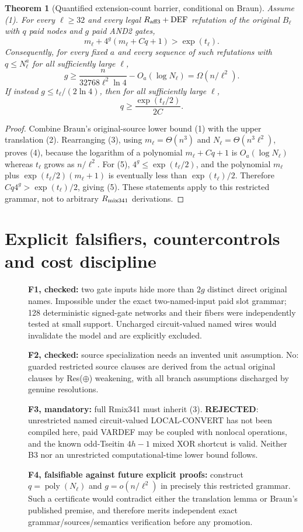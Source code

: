 \documentclass[11pt]{article}
\newtheorem{theorem}{Theorem}
\begin{document}
\begin{theorem}[Quantified extension-count barrier, conditional on Braun]
Assume (1). For every $\ell\ge32$ and every legal $R_{\rm aff3}+\mathrm{DEF}$ refutation of the original $B_\ell$ with $q$ paid nodes and $g$ paid AND2 gates,
\[
 \boxed{m_\ell+4^g(m_\ell+Cq+1)>\exp(t_\ell).}\tag{3}
\]
Consequently, for every fixed $a$ and every sequence of such refutations with $q\le N_\ell^a$ for all sufficiently large $\ell$,
\[
 \boxed{g\ge \frac{n}{32768\ell^2\ln4}-O_a(\log N_\ell)=\Omega(n/\ell^2).}\tag{4}
\]
If instead $g\le t_\ell/(2\ln4)$, then for all sufficiently large $\ell$,
\[
\boxed{q\ge \frac{\exp(t_\ell/2)}{2C}.}\tag{5}
\]
\end{theorem}
\begin{proof}
Combine Braun's original-source lower bound (1) with the upper translation (2). Rearranging (3), using $m_\ell=\Theta(n^3)$ and $N_\ell=\Theta(n^3\ell^2)$, proves (4), because the logarithm of a polynomial $m_\ell+Cq+1$ is $O_a(\log N_\ell)$ whereas $t_\ell$ grows as $n/\ell^2$. For (5), $4^g\le\exp(t_\ell/2)$, and the polynomial $m_\ell$ plus $\exp(t_\ell/2)(m_\ell+1)$ is eventually less than $\exp(t_\ell)/2$. Therefore $Cq4^g>\exp(t_\ell)/2$, giving (5). These statements apply to this restricted grammar, not to arbitrary $R_{\rm mix341}$ derivations.
\end{proof}

\section*{Explicit falsifiers, countercontrols and cost discipline}
\begin{description}
\item[] \textbf{F1, checked:} two gate inputs hide more than $2g$ distinct direct original names. Impossible under the exact two-named-input paid slot grammar; 128 deterministic signed-gate networks and their fibers were independently tested at small support. Uncharged circuit-valued named wires would invalidate the model and are explicitly excluded.
\item[] \textbf{F2, checked:} source specialization needs an invented unit assumption. No: guarded restricted source clauses are derived from the actual original clauses by Res($\oplus$) weakening, with all branch assumptions discharged by genuine resolutions.
\item[] \textbf{F3, mandatory:} full Rmix341 must inherit (3). \textbf{REJECTED}: unrestricted named circuit-valued LOCAL-CONVERT has not been compiled here, paid VARDEF may be coupled with nonlocal operations, and the known odd-Tseitin $4h-1$ mixed XOR shortcut is valid. Neither B3 nor an unrestricted computational-time lower bound follows.
\item[] \textbf{F4, falsifiable against future explicit proofs:} construct $q=\operatorname{poly}(N_\ell)$ and $g=o(n/\ell^2)$ in precisely this restricted grammar. Such a certificate would contradict either the translation lemma or Braun's published premise, and therefore merits independent exact grammar/sources/semantics verification before any promotion.
\end{description}
\end{document}
